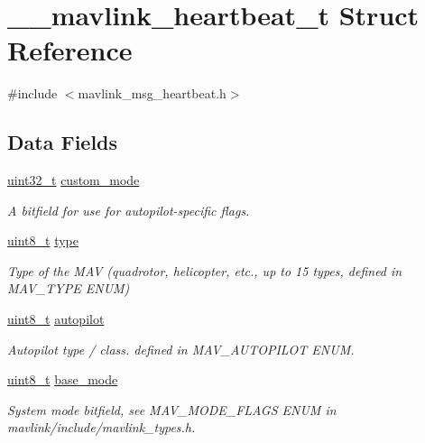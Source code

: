 \hypertarget{struct____mavlink__heartbeat__t}{\section{\-\_\-\-\_\-mavlink\-\_\-heartbeat\-\_\-t Struct Reference}
\label{struct____mavlink__heartbeat__t}
}


{\ttfamily \#include $<$mavlink\-\_\-msg\-\_\-heartbeat.\-h$>$}

\subsection*{Data Fields}
\begin{DoxyCompactItemize}
\item 
\hyperlink{stdint_8h_a435d1572bf3f880d55459d9805097f62}{uint32\-\_\-t} \hyperlink{struct____mavlink__heartbeat__t_a4d8e5d4a59f775887eaecfd58303e17d}{custom\-\_\-mode}
\begin{DoxyCompactList}\small\item\em A bitfield for use for autopilot-\/specific flags. \end{DoxyCompactList}\item 
\hyperlink{stdint_8h_aba7bc1797add20fe3efdf37ced1182c5}{uint8\-\_\-t} \hyperlink{struct____mavlink__heartbeat__t_a2f34a5f641022acd59d9b54e69976341}{type}
\begin{DoxyCompactList}\small\item\em Type of the M\-A\-V (quadrotor, helicopter, etc., up to 15 types, defined in M\-A\-V\-\_\-\-T\-Y\-P\-E E\-N\-U\-M) \end{DoxyCompactList}\item 
\hyperlink{stdint_8h_aba7bc1797add20fe3efdf37ced1182c5}{uint8\-\_\-t} \hyperlink{struct____mavlink__heartbeat__t_a5be04782d8a0bb715ad26c25cce74b9b}{autopilot}
\begin{DoxyCompactList}\small\item\em Autopilot type / class. defined in M\-A\-V\-\_\-\-A\-U\-T\-O\-P\-I\-L\-O\-T E\-N\-U\-M. \end{DoxyCompactList}\item 
\hyperlink{stdint_8h_aba7bc1797add20fe3efdf37ced1182c5}{uint8\-\_\-t} \hyperlink{struct____mavlink__heartbeat__t_a816ec38dcbb0f4948185efbdd96ebb5e}{base\-\_\-mode}
\begin{DoxyCompactList}\small\item\em System mode bitfield, see M\-A\-V\-\_\-\-M\-O\-D\-E\-\_\-\-F\-L\-A\-G\-S E\-N\-U\-M in mavlink/include/mavlink\-\_\-types.\-h. \end{DoxyCompactList}\item 

\end{DoxyCompactItemize}
